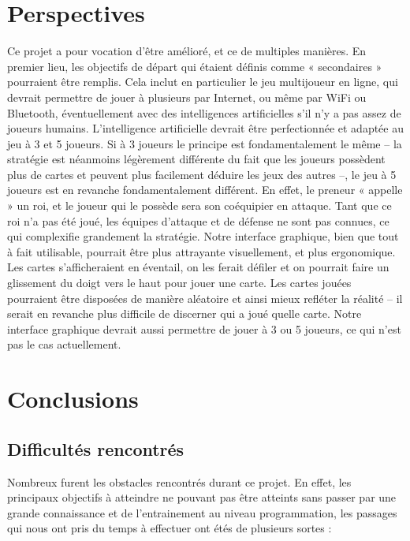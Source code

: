 \documentclass[a4paper]{report}
\begin{document}
	\section{Perspectives}
		Ce projet a pour vocation d’être amélioré, et ce de multiples manières. En premier lieu, les objectifs de départ qui étaient définis comme « secondaires » pourraient être remplis.
		Cela inclut en particulier le jeu multijoueur en ligne, qui devrait permettre de jouer à plusieurs par Internet, ou même par WiFi ou Bluetooth, éventuellement avec des intelligences 			artificielles s’il n’y a pas assez de joueurs humains.
		L’intelligence artificielle devrait être perfectionnée et adaptée au jeu à 3 et 5 joueurs. Si à 3 joueurs le principe est fondamentalement le même – la stratégie est néanmoins 		légèrement différente du fait que les joueurs possèdent plus de cartes et peuvent plus facilement déduire les jeux des autres –, le jeu à 5 joueurs est en revanche fondamentalement 			différent. En effet, le preneur « appelle » un roi, et le joueur qui le possède sera son coéquipier en attaque. Tant que ce roi n’a pas été joué, les équipes d’attaque et de défense ne 			sont pas connues, ce qui complexifie grandement la stratégie. 
		Notre interface graphique, bien que tout à fait utilisable, pourrait être plus attrayante visuellement, et plus ergonomique. Les cartes s’afficheraient en éventail, on les ferait 			défiler et on pourrait faire un glissement du doigt vers le haut pour jouer une carte. Les cartes jouées pourraient être disposées de manière aléatoire et ainsi mieux refléter la 			réalité – il serait en revanche plus difficile de discerner qui a joué quelle carte.
		Notre interface graphique devrait aussi permettre de jouer à 3 ou 5 joueurs, ce qui n’est pas le cas actuellement.
			
	\section{Conclusions}	
		\subsection{Difficultés rencontrés}

Nombreux furent les obstacles rencontrés durant ce projet. En effet, les principaux objectifs à atteindre ne pouvant pas être atteints sans passer par une grande connaissance et de l’entrainement au niveau programmation, les passages qui nous ont pris du temps à effectuer ont étés de plusieurs sortes :
\end{document}
